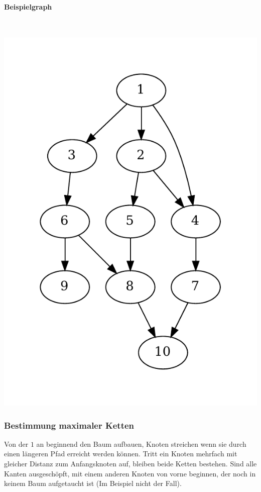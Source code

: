 \paragraph{Beispielgraph}\\
\begin{center}
\includegraphics[scale=0.7]{images/BeispielgraphGraphentheorie.pdf}
\end{center}


\subsubsection{Bestimmung maximaler Ketten}
Von der $1$ an beginnend den Baum aufbauen, Knoten streichen wenn sie durch einen längeren
Pfad erreicht werden können. Tritt ein Knoten mehrfach mit gleicher Distanz zum Anfangsknoten
auf, bleiben beide Ketten bestehen. Sind alle Kanten ausgeschöpft, mit einem anderen Knoten von
vorne beginnen, der noch in keinem Baum aufgetaucht ist (Im Beispiel nicht der Fall).

